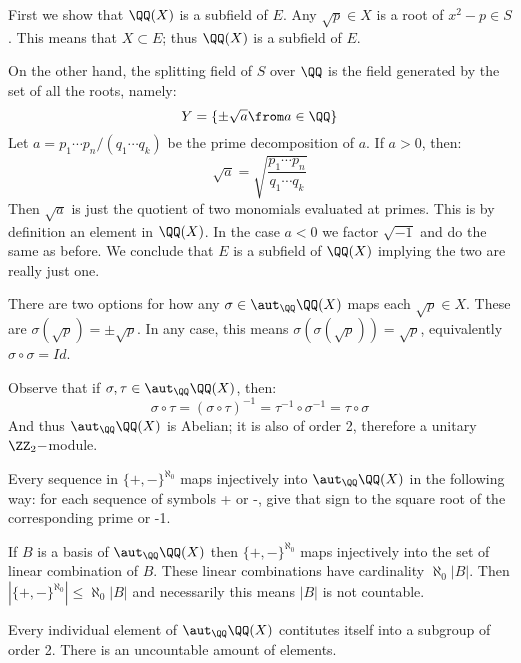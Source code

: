 First we show that $\QQ(X)$ is a subfield of $E$. Any $\sqrt{p}\in X$ is a root of $x^2 -p\in S$. This means that $X\subset E$; thus $\QQ(X)$ is a subfield of $E$.

On the other hand, the splitting field of $S$ over $\QQ$ is the field generated by the set of all the roots, namely:
$$Y=\{\pm\sqrt{a}\from a\in \QQ\}$$
Let $a=p_1\cdots p_n/(q_1\cdots q_k)$ be the prime decomposition of $a$. If $a>0$, then:
$$\sqrt{a} = \sqrt{\frac{p_1\cdots p_n}{q_1\cdots q_k}}$$
Then $\sqrt{a}$ is just the quotient of two monomials evaluated at primes. This is by definition an element in $\QQ(X)$. In the case $a<0$ we factor $\sqrt{-1}$ and do the same as before. We conclude that $E$ is a subfield of $\QQ(X)$ implying the two are really just one.


There are two options for how any $\sigma \in \aut_{\QQ}\QQ(X)$ maps each $\sqrt{p}\in X$. These are $\sigma(\sqrt{p})=\pm \sqrt{p}$. In any case, this means $\sigma(\sigma(\sqrt{p}))=\sqrt{p}$, equivalently $\sigma\circ\sigma=Id$.

Observe that if $\sigma,\tau\in \aut_\QQ \QQ(X)$, then:
$$\sigma\circ\tau = (\sigma\circ\tau)^{-1} = \tau^{-1}\circ\sigma^{-1}=\tau\circ\sigma$$
And thus $\aut_\QQ\QQ(X)$ is Abelian; it is also of order 2, therefore a unitary $\ZZ_2-$module.

Every sequence in $\{+,-\}^{\aleph_0}$ maps injectively into $\aut_\QQ \QQ(X)$ in the following way: for each sequence of symbols + or -, give that sign to the square root of the corresponding prime or -1.

If $B$ is a basis of $\aut_\QQ \QQ(X)$ then $\{+,-\}^{\aleph_0}$ maps injectively into the set of linear combination of $B$. These linear combinations have cardinality $\aleph_0|B|$. Then $|\{+,-\}^{\aleph_0}|\leq \aleph_0|B|$ and necessarily this means $|B|$ is not countable.

Every individual element of $\aut_\QQ \QQ(X)$ contitutes itself into a subgroup of order 2. There is an uncountable amount of elements.

